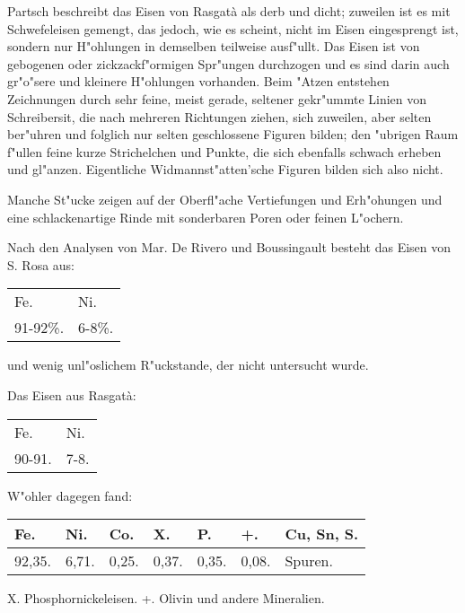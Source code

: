 \documentclass[a4paper, 11pt, oneside]{article}
\begin{document}
Partsch beschreibt das Eisen von Rasgatà als derb und dicht; zuweilen ist es mit Schwefeleisen gemengt, das jedoch, wie es scheint, nicht im Eisen eingesprengt ist, sondern nur H"ohlungen in demselben teilweise ausf"ullt. Das Eisen ist von gebogenen oder zickzackf"ormigen Spr"ungen durchzogen und es sind darin auch gr"o"sere und kleinere H"ohlungen vorhanden. Beim "Atzen entstehen Zeichnungen durch sehr feine, meist gerade, seltener gekr"ummte Linien von Schreibersit, die nach mehreren Richtungen ziehen, sich zuweilen, aber selten ber"uhren und folglich nur selten geschlossene Figuren bilden; den "ubrigen Raum f"ullen feine kurze Strichelchen und Punkte, die sich ebenfalls schwach erheben und gl"anzen. Eigentliche Widmannst"atten'sche Figuren bilden sich also nicht.

Manche St"ucke zeigen auf der Oberfl"ache Vertiefungen und Erh"ohungen und eine schlackenartige Rinde mit sonderbaren Poren oder feinen L"ochern.

Nach den Analysen von Mar. De Rivero und Boussingault besteht das Eisen von S. Rosa aus:
\begin{table}[H]
    \centering
    \begin{tabular}{l l}
        Fe. & Ni. \\
        91-92\%. & 6-8\%. \\
    \end{tabular}
\end{table}

und wenig unl"oslichem R"uckstande, der nicht untersucht wurde.

Das Eisen aus Rasgatà:  
\begin{table}[H]
    \centering
    \begin{tabular}{l l}
        Fe. & Ni. \\
        90-91. & 7-8. \\
    \end{tabular}
\end{table}

W"ohler dagegen fand:
\begin{table}[H]
    \centering
    \begin{tabular}{l l l l l l l}
        Fe. & Ni. & Co. & X. & P. & +. & Cu, Sn, S.  \\ \hline
        92,35. & 6,71. & 0,25. & 0,37. & 0,35. & 0,08. & Spuren. \\
    \end{tabular}
\end{table}

X. Phosphornickeleisen.  
+. Olivin und andere Mineralien.
\end{document}
